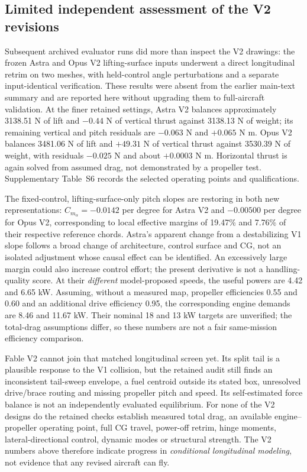 \documentclass[10pt,letterpaper]{article}
\begin{document}
\subsection{Limited independent assessment of the V2 revisions}
Subsequent archived evaluator runs did more than inspect the V2 drawings: the frozen Astra and Opus V2 lifting-surface inputs underwent a direct longitudinal retrim on two meshes, with held-control angle perturbations and a separate input-identical verification. These results were absent from the earlier main-text summary and are reported here without upgrading them to full-aircraft validation. At the finer retained settings, Astra V2 balances approximately 3138.51 N of lift and $-0.44$ N of vertical thrust against 3138.13 N of weight; its remaining vertical and pitch residuals are $-0.063$ N and $+0.065$ N m. Opus V2 balances 3481.06 N of lift and $+49.31$ N of vertical thrust against 3530.39 N of weight, with residuals $-0.025$ N and about $+0.0003$ N m. Horizontal thrust is again solved from assumed drag, not demonstrated by a propeller test. Supplementary Table~S6 records the selected operating points and qualifications.

The fixed-control, lifting-surface-only pitch slopes are restoring in both new representations: $C_{m_\alpha}=-0.0142$ per degree for Astra V2 and $-0.00500$ per degree for Opus V2, corresponding to local effective margins of 19.47\% and 7.76\% of their respective reference chords. Astra's apparent change from a destabilizing V1 slope follows a broad change of architecture, control surface and CG, not an isolated adjustment whose causal effect can be identified. An excessively large margin could also increase control effort; the present derivative is not a handling-quality score. At their \emph{different} model-proposed speeds, the useful powers are 4.42 and 6.65 kW. Assuming, without a measured map, propeller efficiencies 0.55 and 0.60 and an additional drive efficiency 0.95, the corresponding engine demands are 8.46 and 11.67 kW. Their nominal 18 and 13 kW targets are unverified; the total-drag assumptions differ, so these numbers are not a fair same-mission efficiency comparison.

Fable V2 cannot join that matched longitudinal screen yet. Its split tail is a plausible response to the V1 collision, but the retained audit still finds an inconsistent tail-sweep envelope, a fuel centroid outside its stated box, unresolved drive/brace routing and missing propeller pitch and speed. Its self-estimated force balance is not an independently evaluated equilibrium. For none of the V2 designs do the retained checks establish measured total drag, an available engine--propeller operating point, full CG travel, power-off retrim, hinge moments, lateral-directional control, dynamic modes or structural strength. The V2 numbers above therefore indicate progress in \emph{conditional longitudinal modeling}, not evidence that any revised aircraft can fly.
\end{document}
